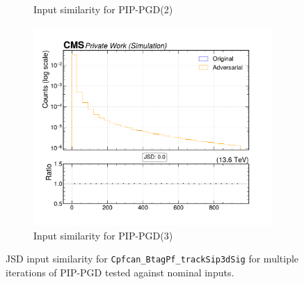 \begin{figure}[htbp]
\begin{subfigure}[t]{0.32\textwidth}
    \caption*{Input similarity for PIP-PGD(2)}
  \end{subfigure}\hfill
  \begin{subfigure}[t]{0.32\textwidth}
    \includegraphics[width=\linewidth]{media/output/features/compare/combined_it_3/cmp_cpf_arr_Cpfcan_BtagPf_trackSip3dSig.pdf}
    \caption*{Input similarity for PIP-PGD(3)}
  \end{subfigure}

  \caption*{JSD input similarity for \texttt{Cpfcan\_BtagPf\_trackSip3dSig} for multiple iterations of PIP-PGD tested against nominal inputs.}
  \label{fig:combined_input_Cpfcan_BtagPf_trackSip3dSig}
\end{figure}

